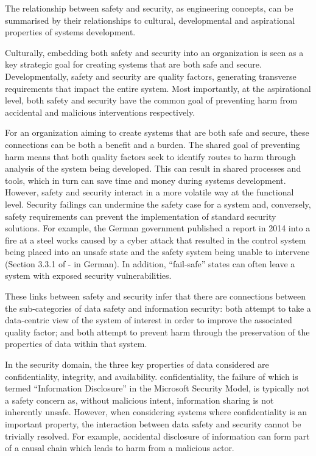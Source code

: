 The relationship between safety and security, as engineering concepts, can be summarised by their relationships to cultural, developmental and aspirational properties of systems development.

Culturally, embedding both safety and security into an organization is seen as a key strategic goal for creating systems that are both safe and secure. Developmentally, safety and security are quality factors, generating transverse requirements that impact the entire system. Most importantly, at the aspirational level, both safety and security have the common goal of preventing harm from accidental and malicious interventions respectively.

For an organization aiming to create systems that are both safe and secure, these connections can be both a benefit and a burden. The shared goal of preventing harm means that both quality factors seek to identify routes to harm through analysis of the system being developed. This can result in shared processes and tools, which in turn can save time and money during systems development. However, safety and security interact in a more volatile way at the functional level. Security failings can undermine the safety case for a system and, conversely, safety requirements can prevent the implementation of standard security solutions. For example, the German government published a report in 2014 into a fire at a steel works caused by a cyber attack that resulted in the control system being placed into an unsafe state and the safety system being unable to intervene (Section 3.3.1 of \cite{citation:DieLage} - in German). In addition, ``fail-safe'' states can often leave a system with exposed security vulnerabilities.

These links between safety and security infer that there are connections between the sub-categories of data safety and information security: both attempt to take a data-centric view of the system of interest in order to improve the associated quality factor; and both attempt to prevent harm through the preservation of the properties of data within that system.

In the security domain, the three key properties of data considered are \gls{confidentiality}, integrity, and \gls{availability}. \Gls{confidentiality}, the failure of which is termed ``Information Disclosure'' in the Microsoft Security Model, \cite{citation:leblanc2002writing} is typically not a safety concern as, without malicious intent, information sharing is not inherently unsafe. However, when considering systems where \gls{confidentiality} is an important property, the interaction between data safety and security cannot be trivially resolved. For example, accidental disclosure of information can form part of a causal chain which leads to harm from a malicious actor.

